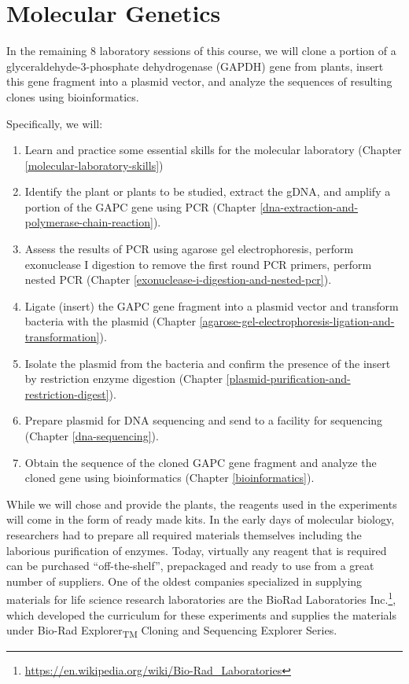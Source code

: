\documentclass[]{book}
\providecommand{\tightlist}{%
  \setlength{\itemsep}{0pt}\setlength{\parskip}{0pt}}
\let\rmarkdownfootnote\footnote%
\def\footnote{\protect\rmarkdownfootnote}
\renewcommand{\href}[2]{#2\footnote{\url{#1}}}
\theoremstyle{definition}
\theoremstyle{definition}
\theoremstyle{definition}
\theoremstyle{remark}
\begin{document}
\chapter*{Molecular Genetics}\label{molecular-genetics}

In the remaining 8 laboratory sessions of this course, we will clone a
portion of a glyceraldehyde-3-phosphate dehydrogenase (GAPDH) gene from
plants, insert this gene fragment into a plasmid vector, and analyze the
sequences of resulting clones using bioinformatics.

Specifically, we will:

\begin{enumerate}
\def\labelenumi{\arabic{enumi}.}
\tightlist
\item
  Learn and practice some essential skills for the molecular laboratory
  (Chapter \ref{molecular-laboratory-skills})
\item
  Identify the plant or plants to be studied, extract the gDNA, and
  amplify a portion of the GAPC gene using PCR (Chapter
  \ref{dna-extraction-and-polymerase-chain-reaction}).
\item
  Assess the results of PCR using agarose gel electrophoresis, perform
  exonuclease I digestion to remove the first round PCR primers, perform
  nested PCR (Chapter \ref{exonuclease-i-digestion-and-nested-pcr}).
\item
  Ligate (insert) the GAPC gene fragment into a plasmid vector and
  transform bacteria with the plasmid (Chapter
  \ref{agarose-gel-electrophoresis-ligation-and-transformation}).
\item
  Isolate the plasmid from the bacteria and confirm the presence of the
  insert by restriction enzyme digestion (Chapter
  \ref{plasmid-purification-and-restriction-digest}).
\item
  Prepare plasmid for DNA sequencing and send to a facility for
  sequencing (Chapter \ref{dna-sequencing}).
\item
  Obtain the sequence of the cloned GAPC gene fragment and analyze the
  cloned gene using bioinformatics (Chapter \ref{bioinformatics}).
\end{enumerate}

While we will chose and provide the plants, the reagents used in the
experiments will come in the form of ready made kits. In the early days
of molecular biology, researchers had to prepare all required materials
themselves including the laborious purification of enzymes. Today,
virtually any reagent that is required can be purchased
``off-the-shelf'', prepackaged and ready to use from a great number of
suppliers. One of the oldest companies specialized in supplying
materials for life science research laboratories are the
\href{https://en.wikipedia.org/wiki/Bio-Rad_Laboratories}{BioRad
Laboratories Inc.}, which developed the curriculum for these experiments
and supplies the materials under Bio-Rad Explorer\textsubscript{TM}
Cloning and Sequencing Explorer Series.
\end{document}
